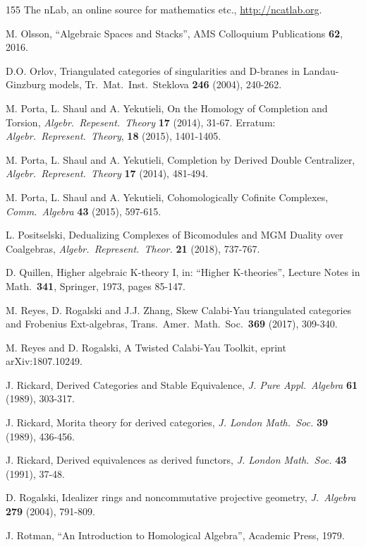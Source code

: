 \begin{thebibliography}{155}
 The nLab, an online source for mathematics etc., 
\url{http://ncatlab.org}.

 M. Olsson,
``Algebraic Spaces and Stacks'', 
AMS Colloquium Publications {\bf 62}, 2016.

 D.O. Orlov, 
Triangulated categories of singularities and D-branes in Landau-Ginzburg 
models, 
Tr.\ Mat.\ Inst.\ Steklova {\bf 246} (2004), 240-262.

 M. Porta, L. Shaul and A. Yekutieli,
On the Homology of Completion and Torsion,
{\em Algebr.\ Repesent.\ Theory} {\bf 17} (2014), 31-67.
Erratum: {\em Algebr.\ Represent.\ Theory}, {\bf 18} (2015), 
1401-1405.

 M. Porta, L. Shaul and A. Yekutieli, 
Completion by Derived Double Centralizer,
{\em Algebr.\ Represent.\ Theory} {\bf 17} (2014), 481-494.

 M. Porta, L. Shaul and A. Yekutieli, 
Cohomologically Cofinite Complexes,
{\em Comm.\ Algebra} {\bf 43} (2015), 597-615. 

 L. Positselski, 
Dedualizing Complexes of Bicomodules and MGM Duality over Coalgebras,
{\em Algebr.\ Represent.\ Theor.} {\bf 21} (2018), 737-767.

 D. Quillen, 
Higher algebraic K-theory I,
in:  ``Higher K-theories'', Lecture Notes in Math.\ {\bf 341}, Springer, 
1973, pages 85-147.

 M. Reyes, D. Rogalski and J.J. Zhang,
Skew Calabi-Yau triangulated categories and Frobenius Ext-algebras,
Trans.\ Amer.\ Math.\ Soc.\ {\bf 369} (2017), 309-340. 

  M. Reyes and D. Rogalski, 
A Twisted Calabi-Yau Toolkit, 
eprint arXiv:1807.10249. 

 J. Rickard, 
Derived Categories and Stable Equivalence, 
{\em J. Pure Appl.\ Algebra} {\bf 61} (1989), 303-317.

 J. Rickard, 
Morita theory for derived categories, 
{\em J. London Math.\ Soc.} {\bf 39} (1989), 436-456.

 J. Rickard, 
Derived equivalences as derived functors, 
{\em J. London Math.\ Soc.} {\bf 43} (1991), 37-48.

 D. Rogalski,
Idealizer rings and noncommutative projective geometry,
{\em J.\ Algebra} {\bf  279} (2004), 791-809.

 J. Rotman,
``An Introduction to Homological Algebra'',
Academic Press, 1979.


\end{thebibliography}
